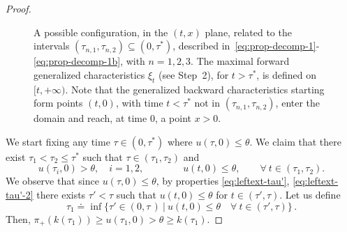 \documentclass[a4paper, 10pt, final]{article}
\begin{document}
\begin{proof}
\begin{figure}
\begin{tikzpicture}[line cap=round,line join=round,x=1.2cm,y=1.2cm]
    \end{tikzpicture}
    \caption{A possible configuration, in the $(t, x)$ plane, 
      related to the intervals $(\tau_{n, 1}, \tau_{n,2}) \subseteq (0, \tau^*)$, described
      in~\eqref{eq:prop-decomp-1}-\eqref{eq:prop-decomp-1b}, with $n=1, 2, 3$. 
      The maximal forward generalized characteristics $\xi_t$ (see Step~2), for $t > \tau^*$, is defined on $[t, +\infty)$.
      Note that the generalized backward characteristics starting form points $(t, 0)$, with time $t < \tau^*$ not in
      $(\tau_{n, 1}, \tau_{n,2})$, enter the domain and reach, at time $0$, a point $x > 0$.
    }
        \label{fig:structure-tau}
  \end{figure}
 






  We start fixing any time
  $\tau\in (0,\tau^*)$ where 
  $u(\tau,0)\leq \theta$.  
  We claim that there exist $\tau_1<\tau_2\leq \tau^*$ such that  $\tau\in (\tau_1, \tau_2)$ and \begin{equation}
  \label{eq:prop-decomp-4}
      u(\tau_{i},0)> \theta,\quad i=1,2,\qquad\qquad 
      u(t,0)\leq  \theta,\qquad\forall~t\in 
      (\tau_{1},\tau_{2}).
  \end{equation}
  We observe that since $u(\tau, 0)\leq \theta$, by   properties \eqref{eq:leftext-tau'}, \eqref{eq:leftext-tau'-2} there exists $\tau'<\tau$ such that  $u(t,0)\leq \theta$ for $t\in(\tau', \tau)$.
  Let us define 
  \[
      {\tau}_1\doteq\inf\Big\{
      \tau'\in (0,\tau\,)
      ~\big|~ 
      u(t,0)\leq \theta\quad\forall~t\in(\tau', \tau)
      \Big\}\,.
  \]
  Then, $\pi_+(k({\tau}_1))\geq u(\tau_1, 0)>\theta\geq k(\tau_1)$.  



\end{proof}
\end{document}
